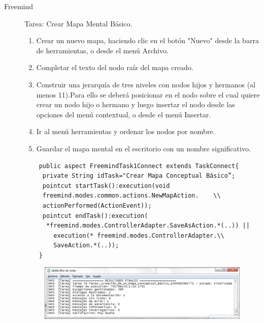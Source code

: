\begin{description}
\item[Freemind]
Tarea: Crear Mapa Mental Básico.
	\begin{enumerate}
		\item Crear un nuevo mapa, haciendo clic en el botón "Nuevo" desde la barra de herramientas, o desde el menú Archivo. 
		\item Completar el texto del nodo raíz del mapa creado.
		\item Construir una jerarquía de tres niveles con nodos hijos y hermanos (al menos 11).Para ello se deberá posicionar en el nodo sobre el cual quiere crear un nodo hijo o hermano y luego insertar el nodo desde las opciones del menú contextual, o desde el menú Insertar.
		\item Ir al menú herramientas y ordenar los nodos por nombre.
		\item Guardar el mapa mental en el escritorio con un nombre significativo.
	\end{enumerate}
\squeezeup
	\begin{verbatim}
	public aspect FreemindTask1Connect extends TaskConnect{
	 private String idTask="Crear Mapa Conceptual Básico”;
	 pointcut startTask():execution(void  
	 freemind.modes.common.actions.NewMapAction.	\\
	 actionPerformed(ActionEvent));
	 pointcut endTask():execution( 	 
	  *freemind.modes.ControllerAdapter.SaveAsAction.*(..)) ||
	    execution(* freemind.modes.ControllerAdapter.\\
	    SaveAction.*(..));
	}
	\end{verbatim}
	\squeezeup
	\squeezeup
	\begin{figure}[ht]
		\centering
		\includegraphics[scale=0.4]{figs/fig4.png}

\end{figure}
\end{description}
